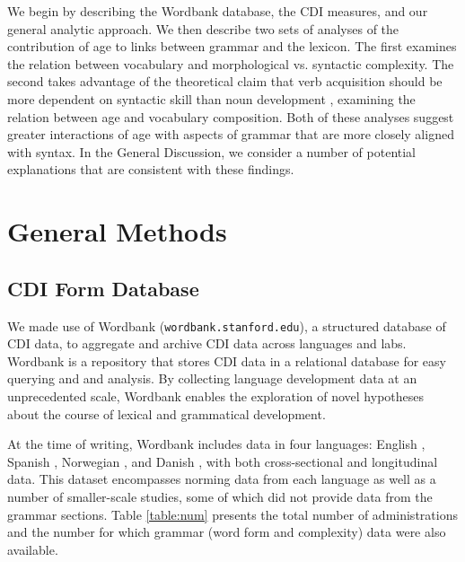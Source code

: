 \documentclass[10pt,letterpaper]{article}
\begin{document}

We begin by describing the Wordbank database, the CDI measures, and our general analytic approach. We then describe two sets of analyses of the contribution of age to links between grammar and the lexicon. The first examines the relation between vocabulary and morphological vs. syntactic complexity. The second takes advantage of the theoretical claim that verb acquisition should be more dependent on syntactic skill than noun development \cite{gleitman1990}, examining the relation between age and vocabulary composition. Both of these analyses suggest greater interactions of age with aspects of grammar that are more closely aligned with syntax. In the General Discussion, we consider a number of potential explanations that are consistent with these findings. 

\section{General Methods}

\subsection{CDI Form Database}

We made use of Wordbank (\texttt{wordbank.stanford.edu}), a structured database of CDI data, to aggregate and archive CDI data across languages and labs. Wordbank is a repository that stores CDI data in a relational database for easy querying and and analysis. By collecting language development data at an unprecedented scale, Wordbank enables the exploration of novel hypotheses about the course of lexical and grammatical development. 

At the time of writing, Wordbank includes data in four languages: English \cite{fenson2007}, Spanish \cite{jackson1993}, Norwegian \cite{simonsen2014}, and Danish \cite{bleses2008}, with both cross-sectional and longitudinal data. This dataset encompasses norming data from each language as well as a number of smaller-scale studies, some of which did not provide data from the grammar sections. Table \ref{table:num} presents the total number of administrations and the number for which grammar (word form and complexity) data were also available.
\end{document}
